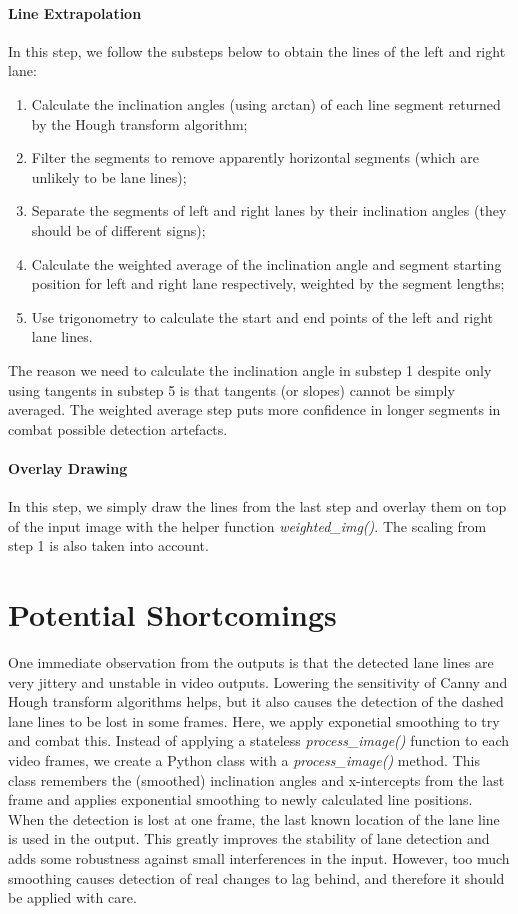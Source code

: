 \documentclass[]{article}
\begin{document}
\paragraph{Line Extrapolation}
In this step, we follow the substeps below to obtain the lines of the left and right lane:
\begin{enumerate}
	\item Calculate the inclination angles (using arctan) of each line segment returned by the Hough transform algorithm;
	\item Filter the segments to remove apparently horizontal segments (which are unlikely to be lane lines);
	\item Separate the segments of left and right lanes by their inclination angles (they should be of different signs);
	\item Calculate the weighted average of the inclination angle and segment starting position for left and right lane respectively, weighted by the segment lengths;
	\item Use trigonometry to calculate the start and end points of the left and right lane lines.
\end{enumerate}
The reason we need to calculate the inclination angle in substep 1 despite only using tangents in substep 5 is that tangents (or slopes) cannot be simply averaged. The weighted average step puts more confidence in longer segments in combat possible detection artefacts.

\paragraph{Overlay Drawing}
In this step, we simply draw the lines from the last step and overlay them on top of the input image with the helper function \textit{weighted\_img()}. The scaling from step 1 is also taken into account.

\section{Potential Shortcomings}

One immediate observation from the outputs is that the detected lane lines are very jittery and unstable in video outputs. Lowering the sensitivity of Canny and Hough transform algorithms helps, but it also causes the detection of the dashed lane lines to be lost in some frames. Here, we apply exponetial smoothing to try and combat this. Instead of applying a stateless \textit{process\_image()} function to each video frames, we create a Python class with a \textit{process\_image()} method. This class remembers the (smoothed) inclination angles and x-intercepts from the last frame and applies exponential smoothing to newly calculated line positions. When the detection is lost at one frame, the last known location of the lane line is used in the output. This greatly improves the stability of lane detection and adds some robustness against small interferences in the input. However, too much smoothing causes detection of real changes to lag behind, and therefore it should be applied with care.
\end{document}
